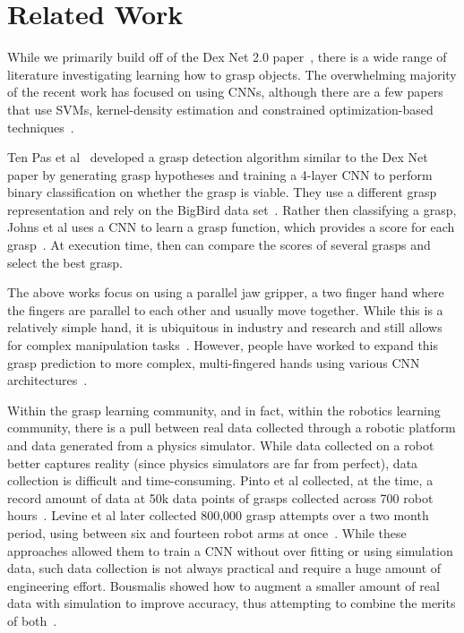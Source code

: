 
\section{Related Work}
\label{sec:related_work}

While we primarily build off of the Dex Net 2.0 paper~\cite{mahler2017dex}, there is a wide range of literature investigating learning how to grasp objects. 
The overwhelming majority of the recent work has focused on using CNNs, although there are a few papers that use SVMs, kernel-density estimation and constrained optimization-based techniques~\cite{jiang2011efficient,kopicki2016one,el2012bridging}. 

Ten Pas et al~\cite{pas2017grasp} developed a grasp detection algorithm similar to the Dex Net paper by generating grasp hypotheses and training a 4-layer CNN to perform binary classification on whether the grasp is viable. 
They use a different grasp representation and rely on the BigBird data set~\cite{singh2014bigbird}. 
Rather then classifying a grasp, Johns et al uses a CNN to learn a grasp function, which provides a score for each grasp~\cite{johns2016deep}. 
At execution time, then can compare the scores of several grasps and select the best grasp.

The above works focus on using a parallel jaw gripper, a two finger hand where the fingers are parallel to each other and usually move together. 
While this is a relatively simple hand, it is ubiquitous in industry and research and still allows for complex manipulation tasks~\cite{mason2011generality}. 
However, people have worked to expand this grasp prediction to more complex, multi-fingered hands using various CNN architectures~\cite{luplanning,varley2015generating,zhou20176dof}. 

Within the grasp learning community, and in fact, within the robotics learning community, there is a pull between real data collected through a robotic platform and data generated from a physics simulator. 
While data collected on a robot better captures reality (since physics simulators are far from perfect), data collection is difficult and time-consuming. 
Pinto et al collected, at the time, a record amount of data at 50k data points of grasps collected across 700 robot hours~\cite{pinto2016supersizing}.
Levine et al later collected 800,000 grasp attempts over a two month period, using between six and fourteen robot arms at once~\cite{levine2016learning}. 
While these approaches allowed them to train a CNN without over fitting or using simulation data, such data collection is not always practical and require a huge amount of engineering effort. 
Bousmalis showed how to augment a smaller amount of real data with simulation to improve accuracy, thus attempting to combine the merits of both~\cite{bousmalis2017using}. 

